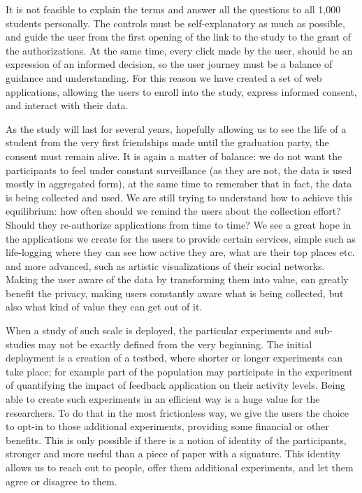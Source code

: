 It is not feasible to explain the terms and answer all the questions to all 1,000 students personally.
The controls must be self-explanatory as much as possible, and guide the user from the first opening of the link to the study to the grant of the authorizations.
At the same time, every click made by the user, should be an expression of an informed decision, so the user journey must be a balance of guidance and understanding.
For this reason we have created a set of web applications, allowing the users to enroll into the study, express informed consent, and interact with their data.

As the study will last for several years, hopefully allowing us to see the life of a student from the very first friendships made until the graduation party, the consent must remain alive.
It is again a matter of balance: we do not want the participants to feel under constant surveillance (as they are not, the data is used mostly in aggregated form), at the same time to remember that in fact, the data is being collected and used.
We are still trying to understand how to achieve this equilibrium: how often should we remind the users about the collection effort? Should they re-authorize applications from time to time?
We see a great hope in the applications we create for the users to provide certain services, simple such as life-logging where they can see how active they are, what are their top places etc. and more advanced, such as artistic visualizations of their social networks.
Making the user aware of the data by transforming them into value, can greatly benefit the privacy, making users constantly aware what is being collected, but also what kind of value they can get out of it.

When a study of such scale is deployed, the particular experiments and sub-studies may not be exactly defined from the very beginning.
The initial deployment is a creation of a testbed, where shorter or longer experiments can take place; for example part of the population may participate in the experiment of quantifying the impact of feedback application on their activity levels.
Being able to create such experiments in an efficient way is a huge value for the researchers. To do that in the most frictionless way, we give the users the choice to opt-in to those additional experiments, providing some financial or other benefits.
This is only possible if there is a notion of identity of the participants, stronger and more useful than a piece of paper with a signature.
This identity allows us to reach out to people, offer them additional experiments, and let them agree or disagree to them.

